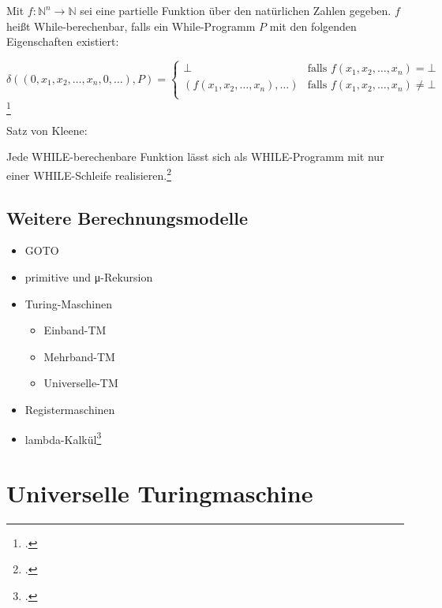 \documentclass{lehramt-informatik-haupt}
\begin{document}
Mit $f : \mathbb{N}^n \rightarrow \mathbb{N}$ sei eine partielle
Funktion über den natürlichen Zahlen gegeben. $f$ heißt
While-berechenbar, falls ein While-Programm $P$ mit den folgenden
Eigenschaften existiert:

\begin{equation*}
\delta((0,x_1,x_2,\dots,x_n,0,\dots), P) =
\begin{cases}
\bot &
\text{falls } f(x_1,x_2,\dots,x_n) = \bot\\

(f(x_1,x_2,\dots,x_n), \dots) &
\text{falls }f(x_1,x_2,\dots,x_n) \neq \bot\\
\end{cases}
\end{equation*}\footcite[Seite 261]{hoffmann}

Satz von Kleene:

Jede WHILE-berechenbare Funktion lässt sich als WHILE-Programm mit nur
einer WHILE-Schleife realisieren.\footcite[Seite 13]{theo:fs:4}

\subsection{Weitere Berechnungsmodelle}

\begin{itemize}
\item GOTO
\item primitive und μ-Rekursion

\item Turing-Maschinen
\begin{itemize}
\item Einband-TM
\item Mehrband-TM
\item Universelle-TM

\end{itemize}
\item Registermaschinen
\item lambda-Kalkül\footcite[Seite 17]{theo:fs:4}
\end{itemize}

%

\section{Universelle Turingmaschine}

\end{document}
